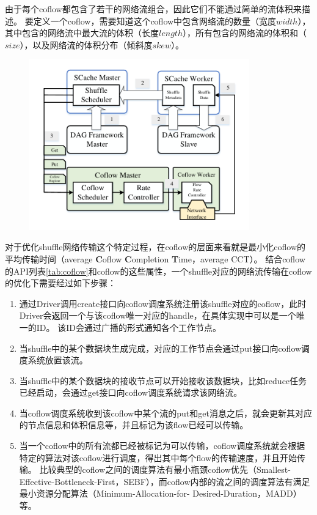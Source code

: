 由于每个coflow都包含了若干的网络流组合，因此它们不能通过简单的流体积来描述。
要定义一个coflow，需要知道这个coflow中包含网络流的数量（宽度$width$），其中包含的网络流中最大流的体积（长度$length$），所有包含的网络流的体积和（$size$），以及网络流的体积分布（倾斜度$skew$）。

\begin{figure}[!htp]
    \centering
    \includegraphics[width=0.85\textwidth]{../figure/coflow.pdf}
\end{figure}

对于优化shuffle网络传输这个特定过程，在coflow的层面来看就是最小化coflow的平均传输时间（average \textbf{C}oflow \textbf{C}ompletion \textbf{T}ime，average CCT）。
结合coflow的API列表\ref{tab:coflow}和coflow的这些属性，一个shuffle对应的网络流传输在coflow的优化下需要经过如下步骤：
\begin{enumerate}
	\item 通过Driver调用create接口向coflow调度系统注册该shuffle对应的coflow，此时Driver会返回一个与该coflow唯一对应的handle，在具体实现中可以是一个唯一的ID。
	该ID会通过广播的形式通知各个工作节点。
	\item 当shuffle中的某个数据块生成完成，对应的工作节点会通过put接口向coflow调度系统放置该流。
	\item 当shuffle中的某个数据块的接收节点可以开始接收该数据块，比如reduce任务已经启动，会通过get接口向coflow调度系统请求该网络流。
	\item 当coflow调度系统收到该coflow中某个流的put和get消息之后，就会更新其对应的节点信息和体积信息等，并且标记为该flow已经可以传输。
	\item 当一个coflow中的所有流都已经被标记为可以传输，coflow调度系统就会根据特定的算法对该coflow进行调度，得出其中每个flow的传输速度，并且开始传输。
	比较典型的coflow之间的调度算法有最小瓶颈coflow优先（Smallest-Effective-Bottleneck-First，SEBF）\cite{varys}，而coflow内部的流之间的调度算法有满足最小资源分配算法（Minimum-Allocation-for-
	Desired-Duration，MADD）\cite{varys}等。
\end{enumerate}

